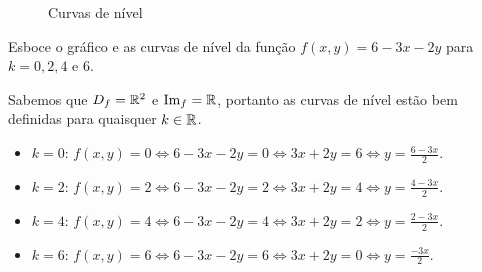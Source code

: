\begin{figure}[htbp]
        \caption{Curvas de nível}
        \label{fig:curvasdenivel}
    \end{figure}

\begin{example}
    Esboce o gráfico e as curvas de nível da função \(f(x,y) = 6 -3x - 2y\) para \(k=0,2,4\) e \(6\).

    Sabemos que \(D_f = \mathbb{R}^2\) e \(\operatorname{Im}_f = \mathbb{R}\), portanto as curvas de nível estão bem definidas para quaisquer \(k\in\mathbb{R}\).
        \begin{itemize}
            \item \(k = 0\): \(f(x,y) = 0 \Leftrightarrow 6 - 3x - 2y = 0 \Leftrightarrow 3x + 2y = 6 \Leftrightarrow y = \frac{6 - 3x}{2}\).
            \item \(k = 2\): \(f(x,y) = 2 \Leftrightarrow 6 - 3x - 2y = 2 \Leftrightarrow 3x + 2y = 4 \Leftrightarrow y = \frac{4 - 3x}{2}\).
            \item \(k = 4\): \(f(x,y) = 4 \Leftrightarrow 6 - 3x - 2y = 4 \Leftrightarrow 3x + 2y = 2 \Leftrightarrow y = \frac{2 - 3x}{2}\).
            \item \(k = 6\): \(f(x,y) = 6 \Leftrightarrow 6 - 3x - 2y = 6 \Leftrightarrow 3x + 2y = 0 \Leftrightarrow y = \frac{-3x}{2}\).
        \end{itemize}


\end{example}
